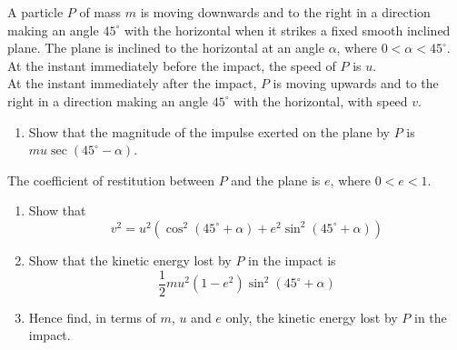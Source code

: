 \documentclass[leqno]{article}
\begin{document}
\begin{enumerate}[
  label=\textbf{\arabic*.},
  leftmargin=*,
  topsep=0pt,
  partopsep=0pt,
  parsep=0pt
]
\newpage

\questionitem

A particle $P$ of mass $m$ is moving downwards and to the right in a direction making an angle $45^\circ$ with the horizontal when it strikes a fixed smooth inclined plane. The plane is inclined to the horizontal at an angle $\alpha$, where $0<\alpha<45^\circ$. \\

At the instant immediately before the impact, the speed of $P$ is $u$. \\

At the instant immediately after the impact, $P$ is moving upwards and to the right in a direction making an angle $45^\circ$ with the horizontal, with speed $v$. \\

\begin{enumerate}[label=\textbf{(\alph*)}]
  \item Show that the magnitude of the impulse exerted on the plane by $P$ is $mu \sec(45^\circ-\alpha)$.  \\
\end{enumerate}
The coefficient of restitution between $P$ and the plane is $e$, where $0<e<1$. \\

\begin{enumerate}[label=\textbf{(\alph*)}, resume]
  \item Show that
  \[
  v^2=u^2\left(\cos^2(45^\circ+\alpha)+e^2\sin^2(45^\circ+\alpha)\right)
  \] 
  \item Show that the kinetic energy lost by $P$ in the impact is
  \[
  \dfrac{1}{2} m u^2 (1-e^2)\sin^2(45^\circ+\alpha)
  \] 
  \item Hence find, in terms of $m$, $u$ and $e$ only, the kinetic energy lost by $P$ in the impact.  \\
\end{enumerate}

\newpage


\questionitem

\begin{figure}[H]
    \centering
{}
\end{figure}
\end{enumerate}
\end{document}
